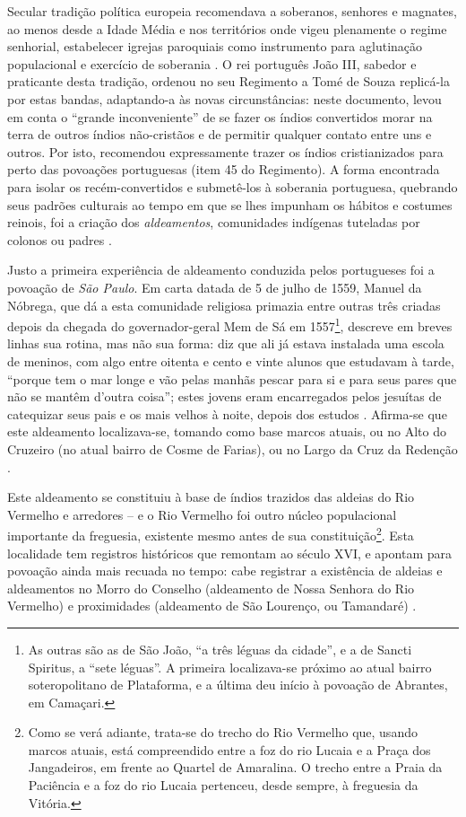 Secular tradição política europeia recomendava a soberanos, senhores e magnates, ao menos desde a Idade Média e nos territórios onde vigeu plenamente o regime senhorial, estabelecer igrejas paroquiais como instrumento para aglutinação populacional e exercício de soberania \cite[pp.~193-205]{BERNARDO1997}. O rei português João III, sabedor e praticante desta tradição, ordenou no seu Regimento a Tomé de Souza replicá-la por estas bandas, adaptando-a às novas circunstâncias: neste documento, levou em conta o ``grande inconveniente'' de se fazer os índios convertidos morar na terra de outros índios não-cristãos e de permitir qualquer contato entre uns e outros. Por isto, recomendou expressamente trazer os índios cristianizados para perto das povoações portuguesas (item 45 do Regimento). A forma encontrada para isolar os recém-convertidos e submetê-los à soberania portuguesa, quebrando seus padrões culturais ao tempo em que se lhes impunham os hábitos e costumes reinois, foi a criação dos \textit{aldeamentos}, comunidades indígenas tuteladas por colonos ou padres \cite[pp.~72-76]{santos_salvador_2004}.

Justo a primeira experiência de aldeamento conduzida pelos portugueses foi a povoação de \textit{São Paulo}. Em carta datada de 5 de julho de 1559, Manuel da Nóbrega, que dá a esta comunidade religiosa primazia entre outras três criadas depois da chegada do governador-geral Mem de Sá em 1557\footnote{As outras são as de São João, ``a três léguas da cidade'', e a de Sancti Spiritus, a ``sete léguas''. A primeira localizava-se próximo ao atual bairro soteropolitano de Plataforma, e a última deu início à povoação de Abrantes, em Camaçari.}, descreve em breves linhas sua rotina, mas não sua forma: diz que ali já estava instalada uma escola de meninos, com algo entre oitenta e cento e vinte alunos que estudavam à tarde, ``porque tem o mar longe e vão pelas manhãs pescar para si e para seus pares que não se mantêm d'outra coisa''; estes jovens eram encarregados pelos jesuítas de catequizar seus pais e os mais velhos à noite, depois dos estudos \cite[p.~179]{nobrega_cartas_1931}. Afirma-se que este aldeamento localizava-se, tomando como base marcos atuais, ou no Alto do Cruzeiro (no atual bairro de Cosme de Farias), ou no Largo da Cruz da Redenção \cite[p.~87]{campos_brotas_1942}.

Este aldeamento se constituiu à base de índios trazidos das aldeias do Rio Vermelho e arredores -- e o Rio Vermelho foi outro núcleo populacional importante da freguesia, existente mesmo antes de sua constituição\footnote{Como se verá adiante, trata-se do trecho do Rio Vermelho que, usando marcos atuais, está compreendido entre a foz do rio Lucaia e a Praça dos Jangadeiros, em frente ao Quartel de Amaralina. O trecho entre a Praia da Paciência e a foz do rio Lucaia pertenceu, desde sempre, à freguesia da Vitória.}. Esta localidade tem registros históricos que remontam ao século XVI, e apontam para povoação ainda mais recuada no tempo: cabe registrar a existência de aldeias e aldeamentos no Morro do Conselho (aldeamento de Nossa Senhora do Rio Vermelho) e proximidades (aldeamento de São Lourenço, ou Tamandaré) \cite[p.~75]{santos_salvador_2004}.

